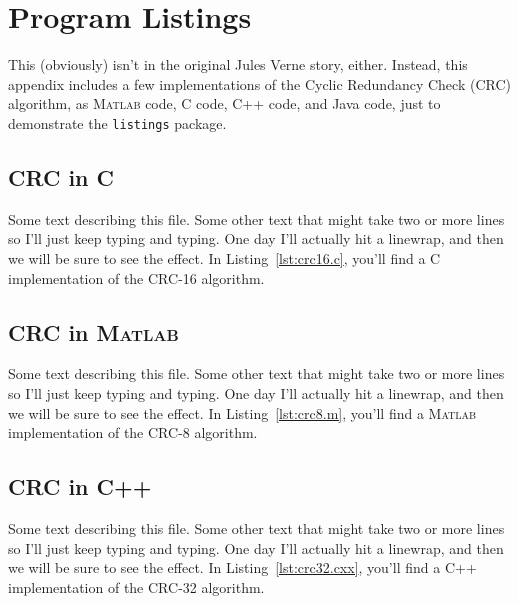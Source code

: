 \chapter{Program Listings}

This (obviously) isn't in the original Jules Verne story, either.  Instead, this
appendix includes a few implementations of the Cyclic Redundancy Check (CRC) 
algorithm, as \textsc{Matlab} code, C code, C++ code, and Java code, just to 
demonstrate the \texttt{listings} package.

\section{CRC in C}
Some text describing this file.  Some other text that might take two or more 
lines so I'll just keep typing and typing.  One day I'll actually hit a 
linewrap, and then we will be sure to see the effect. In Listing~\ref{lst:crc16.c},
you'll find a C implementation of the CRC-16 algorithm.


\section{CRC in \textsc{Matlab}}
Some text describing this file.  Some other text that might take two or more 
lines so I'll just keep typing and typing.  One day I'll actually hit a 
linewrap, and then we will be sure to see the effect. In Listing~\ref{lst:crc8.m},
you'll find a \textsc{Matlab} implementation of the CRC-8 algorithm.


\section{CRC in C++}
Some text describing this file.  Some other text that might take two or more 
lines so I'll just keep typing and typing.  One day I'll actually hit a 
linewrap, and then we will be sure to see the effect. In Listing~\ref{lst:crc32.cxx},
you'll find a C++ implementation of the CRC-32 algorithm.



